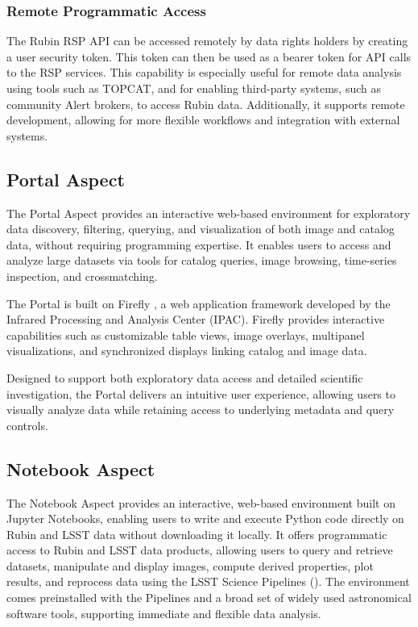 \subsubsection{Remote Programmatic Access}
\label{sssec:remote_api}
%
The Rubin \gls{RSP} \gls{API} can be accessed remotely by data rights holders by creating a user security token.
This token can then be used as a bearer token for \gls{API} calls to the \gls{RSP} services.
This capability is especially useful for remote data analysis using tools such as \gls{TOPCAT}, and for enabling third-party systems, such as community \gls{Alert} brokers, to access Rubin data.
Additionally, it supports remote development, allowing for more flexible workflows and integration with external systems.

\subsection{Portal Aspect}
\label{ssec:rsp_portal}
%
The Portal Aspect provides an interactive web-based environment for exploratory data discovery, filtering, querying, and visualization of both image and catalog data, without requiring programming expertise.
It enables users to access and analyze large datasets via tools for catalog queries, image browsing, time-series inspection, and crossmatching.

The Portal is built on \gls{Firefly} \citep[][]{2019ASPC..521...32W}, a web application framework developed by the Infrared Processing and Analysis Center (IPAC).
\gls{Firefly} provides interactive capabilities such as customizable table views, image overlays, multipanel visualizations, and synchronized displays linking catalog and image data.

Designed to support both exploratory data access and detailed scientific investigation, the Portal delivers an intuitive user experience, allowing users to visually analyze data while retaining access to underlying \gls{metadata} and query controls.

\subsection{Notebook Aspect}
\label{subsec:notebook}
%
The Notebook Aspect provides an interactive, web-based environment built on Jupyter Notebooks, enabling users to write and execute Python code directly on Rubin and \gls{LSST} data without downloading it locally.
It offers programmatic access to Rubin and \gls{LSST} data products, allowing users to query and retrieve datasets, manipulate and display images, compute derived properties, plot results, and reprocess data using the \gls{LSST} Science Pipelines ().
The environment comes preinstalled with the Pipelines and a broad set of widely used astronomical \gls{software} tools, supporting immediate and flexible data analysis.

